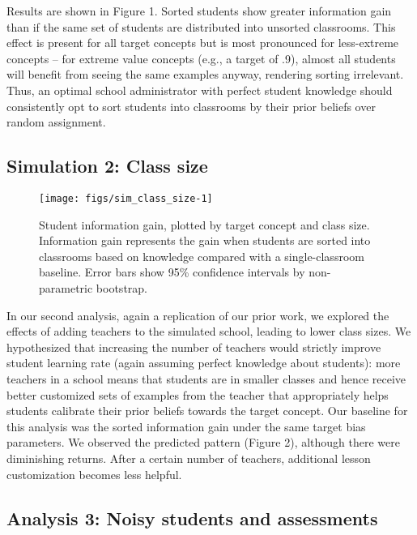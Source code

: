 \documentclass[10pt, letterpaper]{article}
\newenvironment{CodeChunk}{}{}
\begin{document}
Results are shown in Figure 1. Sorted students show greater information
gain than if the same set of students are distributed into unsorted
classrooms. This effect is present for all target concepts but is most
pronounced for less-extreme concepts -- for extreme value concepts
(e.g., a target of .9), almost all students will benefit from seeing the
same examples anyway, rendering sorting irrelevant. Thus, an optimal
school administrator with perfect student knowledge should consistently
opt to sort students into classrooms by their prior beliefs over random
assignment.

\subsection{Simulation 2: Class size}\label{simulation-2-class-size}

\begin{CodeChunk}
\begin{figure}[t]
\texttt{[image: figs/sim\_class\_size-1]} \caption[Student information gain, plotted by target concept and class size]{Student information gain, plotted by target concept and class size. Information gain represents the gain when students are sorted into classrooms based on knowledge compared with a single-classroom baseline. Error bars show 95\% confidence intervals by non-parametric bootstrap.}\label{fig:sim_class_size}
\end{figure}
\end{CodeChunk}

In our second analysis, again a replication of our prior work, we
explored the effects of adding teachers to the simulated school, leading
to lower class sizes. We hypothesized that increasing the number of
teachers would strictly improve student learning rate (again assuming
perfect knowledge about students): more teachers in a school means that
students are in smaller classes and hence receive better customized sets
of examples from the teacher that appropriately helps students calibrate
their prior beliefs towards the target concept. Our baseline for this
analysis was the sorted information gain under the same target bias
parameters. We observed the predicted pattern (Figure 2), although there
were diminishing returns. After a certain number of teachers, additional
lesson customization becomes less helpful.

\subsection{Analysis 3: Noisy students and
assessments}\label{analysis-3-noisy-students-and-assessments}
\end{document}
